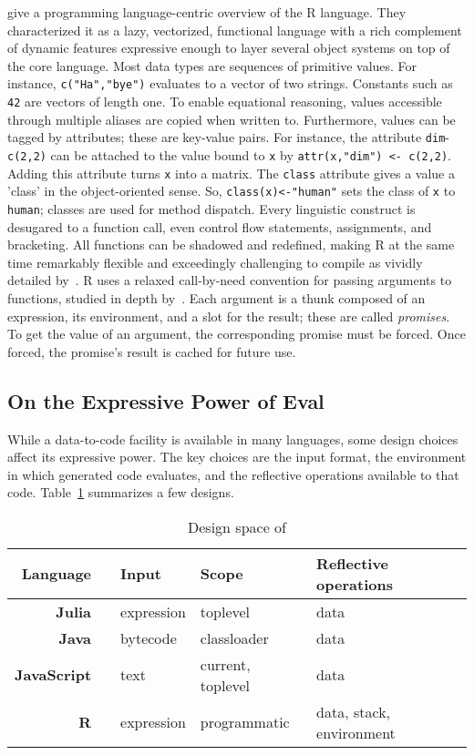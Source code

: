 \documentclass[acmsmall, screen]{acmart}
\renewcommand{\k}[1]{\lstinline |#1|\xspace}
\begin{document}
\citet{ecoop12} give a programming language-centric overview of the R language.
They characterized it as a lazy, vectorized, functional language with a rich
complement of dynamic features expressive enough to layer several object systems
on top of the core language. Most data types are sequences of primitive values.
For instance, \k{c("Ha","bye")} evaluates to a vector of two strings. Constants
such as \k{42} are vectors of length one. To enable equational reasoning, values
accessible through multiple aliases are copied when written to. Furthermore,
values can be tagged by attributes; these are key-value pairs. For instance, the
attribute \k{dim}-\k{c(2,2)} can be attached to the value bound to \k{x} by
\k{attr(x,"dim") <- c(2,2)}. Adding this attribute turns \k{x} into a matrix.
The \k{class} attribute gives a value a 'class' in the object-oriented sense.
So, \k{class(x)<-"human"} sets the class of \k{x} to \k{human}; classes are used
for method dispatch. Every linguistic construct is desugared to a function call,
even control flow statements, assignments, and bracketing. All functions can be
shadowed and redefined, making R at the same time remarkably flexible and
exceedingly challenging to compile as vividly detailed by~\citet{dls19}. R uses
a relaxed call-by-need convention for passing arguments to functions, studied in
depth by~\citet{oopsla19b}. Each argument is a thunk composed of an expression,
its environment, and a slot for the result; these are called \emph{promises}. To
get the value of an argument, the corresponding promise must be forced. Once
forced, the promise's result is cached for future use.

\subsection{On the Expressive Power of Eval}

While a data-to-code facility is available in many languages, some design
choices affect its expressive power. The key choices are the input format, the
environment in which generated code evaluates, and the reflective operations
available to that code. Table~\ref{comp} summarizes a few designs.

\begin{table}[!h]\center\small\begin{tabular}{r@{~}llll}\toprule
\tiny\sc Language&&\sc\tiny Input&\sc\tiny Scope&\tiny\sc Reflective operations\\\midrule
\bf Julia&\cite{julia}     & expression& toplevel         & data\\
\bf Java&\cite{cl}  & bytecode  & classloader       & data\\
\bf JavaScript&\cite{ecoop11}& text      & current, toplevel& data\\
\bf R&\cite{R96}  & expression& programmatic      & data, stack, environment\\\bottomrule
\end{tabular}\caption{Design space of \eval}\label{comp}
\end{table}
\end{document}
